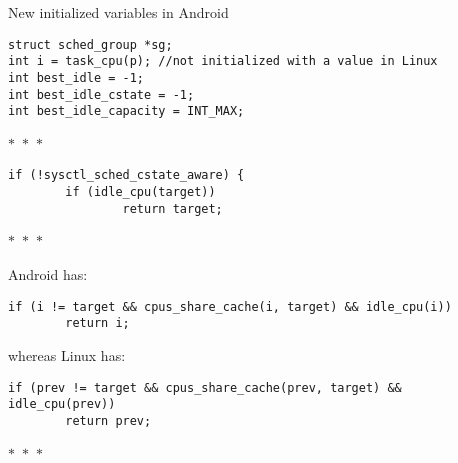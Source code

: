 \documentclass{article}
\newcommand{\divider}{{\begin{center}
  $\ast$~$\ast$~$\ast$
\end{center}}}
\begin{document}
New initialized variables in Android
\begin{verbatim}
struct sched_group *sg;
int i = task_cpu(p); //not initialized with a value in Linux
int best_idle = -1;
int best_idle_cstate = -1;
int best_idle_capacity = INT_MAX;
\end{verbatim}
\divider
\begin{verbatim}
if (!sysctl_sched_cstate_aware) {
        if (idle_cpu(target))
                return target;
\end{verbatim}
\divider
Android has:
\begin{verbatim}
if (i != target && cpus_share_cache(i, target) && idle_cpu(i))
        return i;
\end{verbatim}
whereas Linux has:
\begin{verbatim}
if (prev != target && cpus_share_cache(prev, target) && idle_cpu(prev))
        return prev;
\end{verbatim}
\divider
\end{document}
